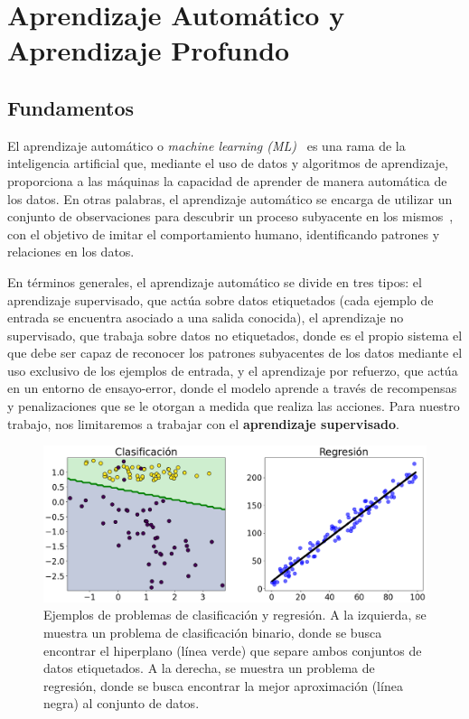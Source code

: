 
\chapter{Aprendizaje Automático y Aprendizaje Profundo}\label{ch:capitulo-aprendizaje-automatico-y-profundo}

\section{Fundamentos}\label{sec:fundamentos-aprendizaje-automatico-y-aprendizaje-profundo}
El aprendizaje automático o \emph{machine learning (ML)}~\cite{Bishop2006, Murphy2022, Murphy2023} es una rama de la inteligencia artificial que, mediante el uso de datos y algoritmos de aprendizaje, proporciona a las máquinas la capacidad de aprender de manera automática de los datos. En otras palabras, el aprendizaje automático se encarga de utilizar un conjunto de observaciones para descubrir un proceso subyacente en los mismos~\cite{Mostafa2012}, con el objetivo de imitar el comportamiento humano, identificando patrones y relaciones en los datos.

En términos generales, el aprendizaje automático se divide en tres tipos: el aprendizaje supervisado, que actúa sobre datos etiquetados (cada ejemplo de entrada se encuentra asociado a una salida conocida), el aprendizaje no supervisado, que trabaja sobre datos no etiquetados, donde es el propio sistema el que debe ser capaz de reconocer los patrones subyacentes de los datos mediante el uso exclusivo de los ejemplos de entrada, y el aprendizaje por refuerzo, que actúa en un entorno de ensayo-error, donde el modelo aprende a través de recompensas y penalizaciones que se le otorgan a medida que realiza las acciones. Para nuestro trabajo, nos limitaremos a trabajar con el \textbf{aprendizaje supervisado}.

\begin{figure}[h]
    \centering
    \includegraphics[width=0.8\linewidth]{img/clasi-regresion.png}
    \caption[Ejemplos de problemas de clasificación y regresión.]{Ejemplos de problemas de clasificación y regresión. A la izquierda, se muestra un problema de clasificación binario, donde se busca encontrar el hiperplano (línea verde) que separe ambos conjuntos de datos etiquetados. A la derecha, se muestra un problema de regresión, donde se busca encontrar la mejor aproximación (línea negra) al conjunto de datos.}\label{fig:clasi-regresion}
\end{figure}

